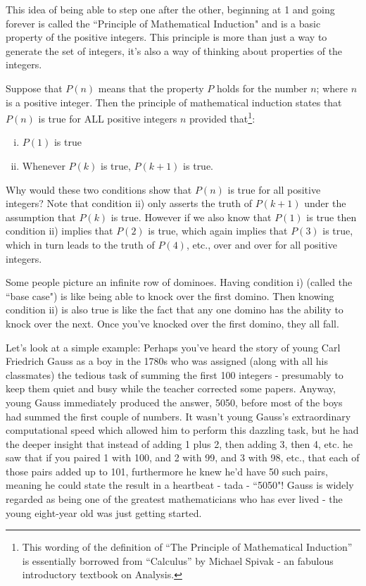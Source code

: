 \documentclass{article}
\begin{document}
This idea of being able to step one after the other,
beginning at 1 and going forever is called the ``Principle of Mathematical
Induction" and is a basic property of the positive integers.
This principle is more than just a way to generate the set of integers,
it's also a way of thinking about properties of the integers.

Suppose
that $P(n)$ means that the property $P$ holds
for the number $n$; where $n$ is a positive integer.
Then the principle of mathematical induction states that $P(n)$
is true for ALL positive integers $n$ provided that\footnote{This wording of the
definition of ``The Principle of Mathematical Induction'' is essentially borrowed
from ``Calculus'' by Michael Spivak - an fabulous introductory textbook on Analysis.}:

\begin{enumerate}[i)]
\item $P(1)$ is true
\item Whenever $P(k)$ is true, $P(k+1)$ is true.
\end{enumerate}

Why would these two conditions show that $P(n)$ is true for all
positive integers? Note that condition ii) only asserts the truth
of $P(k+1)$ under the assumption that $P(k)$ is true.
However if we also know that $P(1)$ is true then condition ii) implies that $P(2)$ is true,
which again implies that $P(3)$ is true,
which in turn leads to the truth of $P(4)$,
etc., over and over for all positive integers.

Some people picture an infinite row of dominoes.
Having condition i) (called the ``base case") is like being
able to knock over the first domino.
Then knowing condition ii) is also true is like the
fact that any one domino has the ability to knock over the next.
Once you've knocked over the first domino,
they all fall.

Let's look at a simple example:
Perhaps you've heard the story of young Carl Friedrich Gauss
as a boy in
the 1780s who was assigned (along with all his classmates)
the tedious task of summing the first 100 integers -
presumably to keep them quiet and busy while the
teacher corrected some papers. Anyway,
young Gauss immediately produced the answer,
5050, before most of the boys had summed the first couple of numbers.
It wasn't young Gauss's extraordinary computational speed which allowed
him to perform this dazzling task,
but he had the deeper insight that instead of adding 1 plus 2,
then adding 3, then 4, etc.
he saw that if you paired 1 with 100,
and 2 with 99,
and 3 with 98,
etc.,
that each of those pairs added up to 101,
furthermore he knew he'd have 50 such pairs,
meaning he could state the result in a heartbeat - tada - ``5050"!
Gauss is widely regarded as being one of the greatest
mathematicians who has ever lived - the young eight-year old was just getting started.
\end{document}
